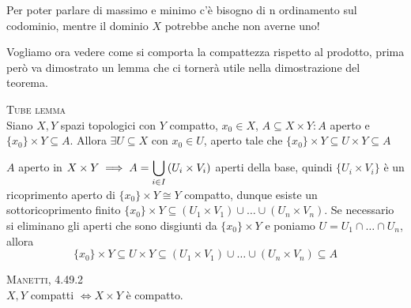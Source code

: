\begin{observe}
	Per poter parlare di massimo e minimo c'è bisogno di n ordinamento sul codominio, mentre il dominio $X$ potrebbe anche non averne uno!
\end{observe}

Vogliamo ora vedere come si comporta la compattezza rispetto al prodotto, prima però va dimostrato un lemma che ci tornerà utile nella dimostrazione del teorema.
\begin{lemming}\textsc{Tube lemma} \label{tube lemma}\\
	Siano $X,Y$ spazi topologici con $Y$ compatto, $x_0\in X$, $A\subseteq X\times Y\colon A$ aperto e $\{x_0\}\times Y\subseteq A$. Allora $\exists U\subseteq X$ con $x_0\in U$, aperto tale che $\{x_0\}\times Y \subseteq U\times Y \subseteq A$
\end{lemming}
\begin{demonstration}
	$A$ aperto in $\displaystyle X\times Y \implies A=\mathop{{\bigcup}}\displaylimits_{i\in I}\left( U_i\times V_i \right)$ aperti della base, quindi $\{U_i\times V_i\}$ è un ricoprimento aperto di $\{x_0\}\times Y \cong Y$ compatto, dunque esiste un sottoricoprimento finito $\{x_0\}\times Y\subseteq (U_1\times V_1)	\cup\dots\cup (U_n\times V_n)$. Se necessario si eliminano gli aperti che sono disgiunti da $\{x_0\}\times Y$ e poniamo $U=U_1\cap\dots\cap U_n$, allora
		\begin{equation*}
			\{x_0\}\times Y\subseteq U\times Y \subseteq (U_1\times V_1)	\cup\dots\cup (U_n\times V_n) \subseteq A
		\end{equation*}
\end{demonstration}
\begin{theorema}\textsc{Manetti, 4.49.2} \label{prodotto compatti}\\
	$X,Y$ compatti $\iff X\times Y$ è compatto.
\end{theorema}
